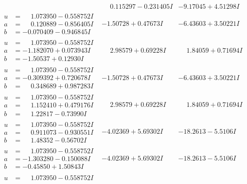 \documentclass[1p]{elsarticle_modified}
\theoremstyle{definition}
\begin{document}
$$\begin{array}{c|c|c}
 & \phantom{-}0.115297 - 0.231405 I & -9.17045 + 4.51298 I \\ \hline\begin{aligned}
u &= \phantom{-}1.073950 - 0.558752 I \\
a &= \phantom{-}0.120889 - 0.856405 I \\
b &= -0.070409 - 0.946845 I\end{aligned}
 & -1.50728 + 0.47673 I & -6.43603 + 3.50221 I \\ \hline\begin{aligned}
u &= \phantom{-}1.073950 - 0.558752 I \\
a &= -1.182070 + 0.073943 I \\
b &= -1.50537 + 0.12930 I\end{aligned}
 & \phantom{-}2.98579 + 0.69228 I & \phantom{-}1.84059 + 0.71694 I \\ \hline\begin{aligned}
u &= \phantom{-}1.073950 - 0.558752 I \\
a &= -0.309392 + 0.720678 I \\
b &= \phantom{-}0.348689 + 0.987283 I\end{aligned}
 & -1.50728 + 0.47673 I & -6.43603 + 3.50221 I \\ \hline\begin{aligned}
u &= \phantom{-}1.073950 - 0.558752 I \\
a &= \phantom{-}1.152410 + 0.479176 I \\
b &= \phantom{-}1.22817 - 0.73990 I\end{aligned}
 & \phantom{-}2.98579 + 0.69228 I & \phantom{-}1.84059 + 0.71694 I \\ \hline\begin{aligned}
u &= \phantom{-}1.073950 - 0.558752 I \\
a &= \phantom{-}0.911073 - 0.930551 I \\
b &= \phantom{-}1.48352 - 0.56702 I\end{aligned}
 & -4.02369 + 5.69302 I & -18.2613 - 5.5106 I \\ \hline\begin{aligned}
u &= \phantom{-}1.073950 - 0.558752 I \\
a &= -1.303280 - 0.150088 I \\
b &= -0.45850 + 1.50843 I\end{aligned}
 & -4.02369 + 5.69302 I & -18.2613 - 5.5106 I \\ \hline\begin{aligned}
u &= \phantom{-}1.073950 - 0.558752 I \\

\end{aligned}
\end{array}$$
\end{document}

